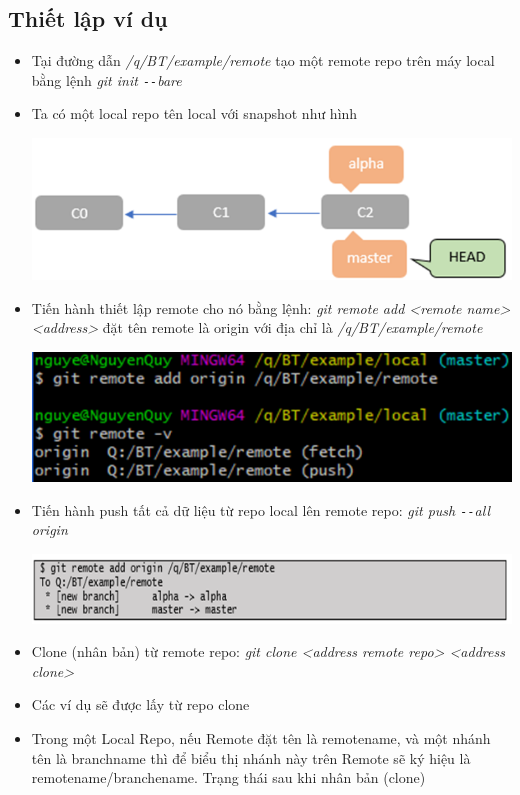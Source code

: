 \documentclass[12pt,a4paper]{report}
\begin{document}
\subsection{Thiết lập ví dụ}
\begin{itemize}
\item Tại đường dẫn {\it /q/BT/example/remote} tạo một remote repo trên máy local bằng lệnh {\it git init \texttt{-{}-}bare}
\item Ta có một local repo tên local với snapshot như hình

	\includegraphics[width=0.8\linewidth]{screenshot065}
	
	\label{fig:screenshot065}

\item Tiến hành thiết lập remote cho nó bằng lệnh: {\it git remote add <remote  name> <address>} đặt tên remote là origin với địa chỉ là {\it /q/BT/example/remote}

	\includegraphics[width=0.8\linewidth]{screenshot066}

	\label{fig:screenshot066}
	
\item Tiến hành push tất cả dữ liệu từ repo local lên remote repo: {\it git push \texttt{-{}-}all origin}

	
	\includegraphics[width=0.8\linewidth]{screenshot07}

	\label{fig:screenshot07}

\item Clone (nhân bản) từ remote repo: {\it git clone <address remote repo> <address clone>}
\item Các ví dụ sẽ được lấy từ repo clone
\item Trong một Local Repo, nếu Remote đặt tên là remotename, và một nhánh tên là branchname thì để biểu thị nhánh này trên Remote sẽ ký hiệu là remotename/branchename. Trạng thái sau khi nhân bản (clone)
\end{itemize}
\end{document}
